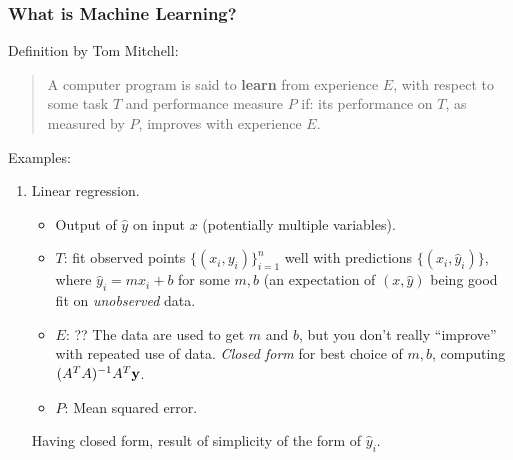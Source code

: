\documentclass{beamer}
\theoremstyle{example}
\begin{document}
\begin{frame}
\frametitle{What is Machine Learning?}
    Definition by Tom Mitchell:\newline 
    \begin{quote}
        A computer program is said to \textbf{learn} from experience $E$, with respect to some task $T$ and performance measure $P$ if: its performance on $T$, as measured by $P$, improves with experience $E$.
    \end{quote}
    
    {\color{mygreen}Examples:}
    \begin{enumerate}
        \item Linear regression.
        \begin{itemize}
            \item Output of $\hat{y}$ on input $x$ (potentially multiple variables).
            \item $T$: fit observed points $\{(x_i,y_i)\}_{i=1}^n$ well with predictions $\{(x_i,\hat{y}_i)\}$, where $\hat{y}_i=mx_i+b$ for some $m,b$ (an expectation of $(x,\hat{y})$ being good fit on \textit{unobserved} data. 
            \item $E$: ?? \newline 
                    The data are used to get $m$ and $b$, but you don't really ``improve'' with repeated use of data. \newline 
                    \emph{Closed form} for best choice of $m, b$, computing $(A^TA)^{-1}A^T{\bf y}$.
            \item $P$: Mean squared error.
        \end{itemize}
        Having closed form, result of simplicity of the form of $\hat{y}_i$.
    \end{enumerate}

\end{frame}
\end{document}
